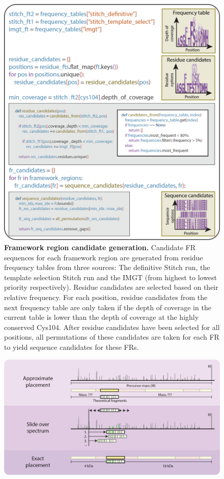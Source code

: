 \begin{subappendices}
\begin{figure}[!htb]
    \includegraphics[]{Chapter.5/Figures/fs1.png}
    \caption{\textbf{Framework region candidate generation.} Candidate FR sequences for each framework region are generated from residue frequency tables from three sources: The definitive Stitch run, the template selection Stitch run and the IMGT (from highest to lowest priority respectively). Residue candidates are selected based on their relative frequency. For each position, residue candidates from the next frequency table are only taken if the depth of coverage in the current table is lower than the depth of coverage at the highly conserved Cys104. After residue candidates have been selected for all positions, all permutations of these candidates are taken for each FR to yield sequence candidates for these FRs.}
    \label{fig:figs5.1}
  \end{figure}
  \begin{figure}[!htb]
    \center
    \includegraphics[]{Chapter.5/Figures/fs2.png}

\end{figure}
\end{subappendices}
